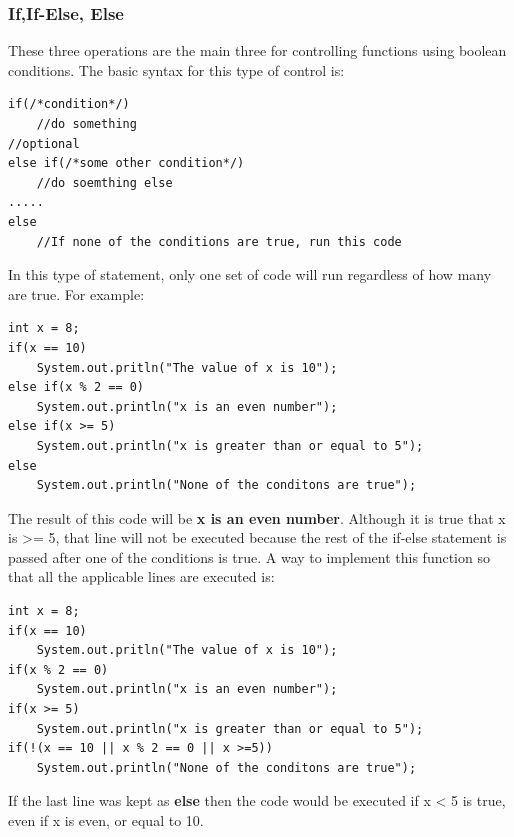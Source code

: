 \documentclass{article}
\begin{document}
\subsubsection{If,If-Else, Else}
These three operations are the main three for controlling functions using boolean conditions. The basic syntax for this type of control is:
\begin{lstlisting}
if(/*condition*/)
	//do something
//optional
else if(/*some other condition*/)
	//do soemthing else
.....
else
	//If none of the conditions are true, run this code
\end{lstlisting}
In this type of statement, only one set of code will run regardless of how many are true. For example:
\begin{lstlisting}
int x = 8;
if(x == 10)
	System.out.pritln("The value of x is 10");
else if(x % 2 == 0)
	System.out.println("x is an even number");
else if(x >= 5)
	System.out.println("x is greater than or equal to 5");
else
	System.out.println("None of the conditons are true");
\end{lstlisting}
The result of this code will be \textbf{x is an even number}. Although it is true that x is >= 5, that line will not be executed because the rest of the if-else statement is passed after one of the conditions is true. A way to implement this function so that all the applicable lines are executed is:
\begin{lstlisting}
int x = 8;
if(x == 10)
	System.out.pritln("The value of x is 10");
if(x % 2 == 0)
	System.out.println("x is an even number");
if(x >= 5)
	System.out.println("x is greater than or equal to 5");
if(!(x == 10 || x % 2 == 0 || x >=5))
	System.out.println("None of the conditons are true");
\end{lstlisting}
If the last line was kept as \textbf{else} then the code would be executed if x < 5 is true, even if x is even, or equal to 10.
\end{document}

